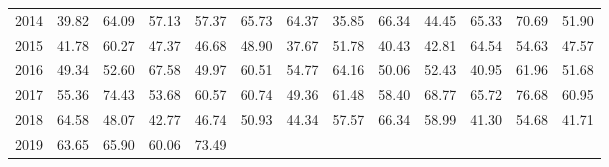 \begin{longtable}{rrrrrrrrrrrrr}
  2014 & 39.82 & 64.09 & 57.13 & 57.37 & 65.73 & 64.37 & 35.85 & 66.34 & 44.45 & 65.33 & 70.69 & 51.90 \\ 
  2015 & 41.78 & 60.27 & 47.37 & 46.68 & 48.90 & 37.67 & 51.78 & 40.43 & 42.81 & 64.54 & 54.63 & 47.57 \\ 
  2016 & 49.34 & 52.60 & 67.58 & 49.97 & 60.51 & 54.77 & 64.16 & 50.06 & 52.43 & 40.95 & 61.96 & 51.68 \\ 
  2017 & 55.36 & 74.43 & 53.68 & 60.57 & 60.74 & 49.36 & 61.48 & 58.40 & 68.77 & 65.72 & 76.68 & 60.95 \\ 
  2018 & 64.58 & 48.07 & 42.77 & 46.74 & 50.93 & 44.34 & 57.57 & 66.34 & 58.99 & 41.30 & 54.68 & 41.71 \\ 
  2019 & 63.65 & 65.90 & 60.06 & 73.49 &  &  &  &  &  &  &  &  \\ 
   \hline
\hline
\end{longtable}
